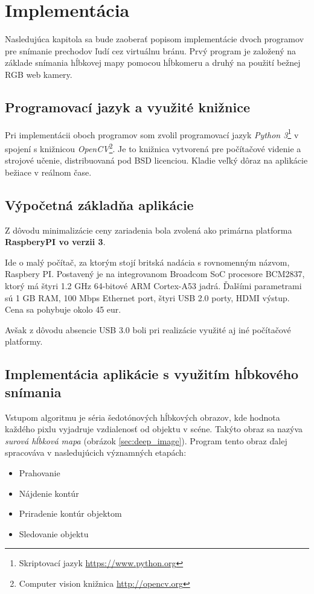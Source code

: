 \chapter{Implementácia}

Nasledujúca kapitola sa bude zaoberať popisom implementácie dvoch programov pre snímanie prechodov ľudí cez virtuálnu bránu. Prvý program je založený na základe snímania hĺbkovej mapy pomocou hĺbkomeru a druhý  na použití bežnej RGB web kamery.

\section{Programovací jazyk a využité knižnice}
Pri implementácii oboch programov som zvolil programovací jazyk \textit{Python 3}\footnote{Skriptovací jazyk \url{https://www.python.org}} v spojení s knižnicou \textit{OpenCV}\footnote{Computer vision knižnica  \url{http://opencv.org}}. Je to knižnica vytvorená pre počítačové videnie a strojové učenie, distribuovaná pod BSD licenciou. Kladie veľký dôraz na aplikácie bežiace v reálnom čase. 

\section{Výpočetná základňa aplikácie}
Z dôvodu minimalizácie ceny zariadenia bola zvolená ako primárna platforma \textbf{RaspberyPI vo verzii 3}. 

Ide o malý počítač, za ktorým stojí britská nadácia s rovnomenným názvom, Raspbery PI. Postavený je na  integrovanom Broadcom SoC procesore BCM2837, ktorý má štyri 1.2 GHz 64-bitové ARM Cortex-A53 jadrá. Ďalšími parametrami sú 1 GB RAM, 100 Mbps Ethernet port, štyri USB 2.0 porty, HDMI výstup. Cena sa pohybuje okolo 45 eur. 

Avšak z dôvodu absencie USB 3.0 boli pri realizácie využité aj iné počítačové platformy.

\section{Implementácia aplikácie s využitím hĺbkového snímania}
Vstupom algoritmu je séria šedotónových hĺbkových obrazov, kde hodnota každého pixlu vyjadruje vzdialenosť od objektu v scéne. Takýto obraz sa nazýva \textit{surová hĺbková mapa} (obrázok \ref{sec:deep_image}). Program tento obraz ďalej spracováva v nasledujúcich významných etapách: 

\begin{itemize}
\item Prahovanie
\item Nájdenie kontúr
\item Priradenie kontúr objektom
\item Sledovanie objektu 
\end{itemize}


